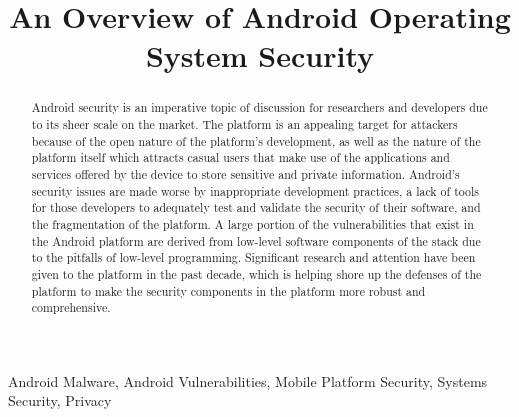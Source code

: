 \documentclass[conference]{IEEEtran}
\begin{document}
\title{An Overview of Android Operating System Security}

\author{
}

\maketitle

\begin{abstract}
Android security is an imperative topic of discussion for researchers and developers due to its sheer scale on the market.
The platform is an appealing target for attackers because of the open nature of the platform's development, as well as the nature of the platform itself which attracts casual users that make use of the applications and services offered by the device to store sensitive and private information.
Android's security issues are made worse by inappropriate development practices, a lack of tools for those developers to adequately test and validate the security of their software, and the fragmentation of the platform.
A large portion of the vulnerabilities that exist in the Android platform are derived from low-level software components of the stack due to the pitfalls of low-level programming.
Significant research and attention have been given to the platform in the past decade, which is helping shore up the defenses of the platform to make the security components in the platform more robust and comprehensive.
\end{abstract}

\begin{IEEEkeywords}
Android Malware,
Android Vulnerabilities,
Mobile Platform Security,
Systems Security,
Privacy
\end{IEEEkeywords}











\begingroup
\raggedright
\setlength{\emergencystretch}{3em}


\endgroup
\end{document}
